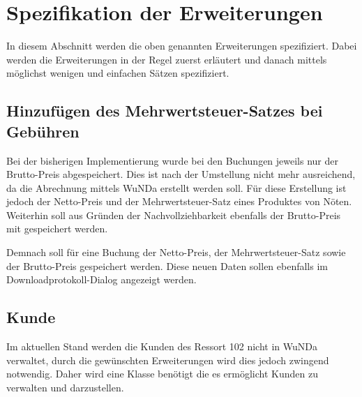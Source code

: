\section{Spezifikation der Erweiterungen} \label{sec:spezifikation}
In diesem Abschnitt werden die oben genannten Erweiterungen spezifiziert. Dabei werden die Erweiterungen in der Regel zuerst erläutert und danach mittels möglichst wenigen und einfachen Sätzen spezifiziert.

\subsection{Hinzufügen des Mehrwertsteuer-Satzes bei Gebühren}
Bei der bisherigen Implementierung wurde bei den Buchungen jeweils nur der Brutto-Preis abgespeichert. Dies ist nach der Umstellung nicht mehr ausreichend, da die Abrechnung mittels \ac{WuNDa} erstellt werden soll. Für diese Erstellung ist jedoch der Netto-Preis und der Mehrwertsteuer-Satz eines Produktes von Nöten. Weiterhin soll aus Gründen der Nachvollziehbarkeit ebenfalls der Brutto-Preis mit gespeichert werden.

Demnach soll für eine Buchung der Netto-Preis, der Mehrwertsteuer-Satz sowie der Brutto-Preis gespeichert werden. Diese neuen Daten sollen ebenfalls im Downloadprotokoll-Dialog angezeigt werden. 
\subsection{Kunde}
Im aktuellen Stand werden die Kunden des Ressort 102 nicht in \ac{WuNDa} verwaltet, durch die gewünschten Erweiterungen wird dies jedoch zwingend notwendig. Daher wird eine Klasse  benötigt die es ermöglicht Kunden zu verwalten und darzustellen. 

